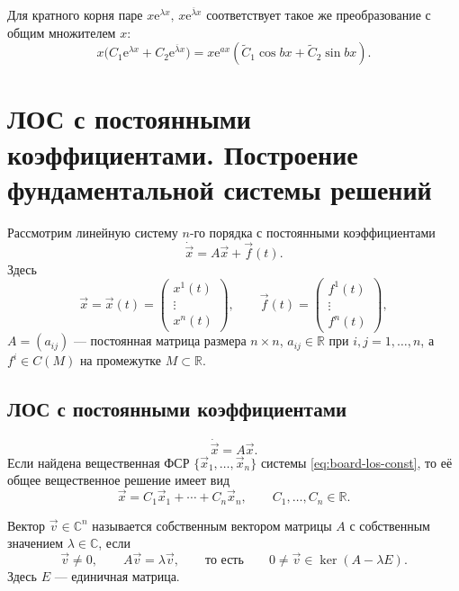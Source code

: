 \documentclass[12pt,a4paper]{article}
\numberwithin{equation}{section}
\newcommand{\R}{\mathbb{R}}
\newcommand{\vect}[1]{\vec{#1}}
\newcommand{\e}{\mathrm{e}}
\DeclareRobustCommand{\examtag}[1]{\space{\normalfont\small\color{HSEgray}(#1)}}
\begin{document}
Для кратного корня паре \(x\e^{\lambda x},\,x\e^{\overline\lambda x}\)
соответствует такое же преобразование с общим множителем \(x\):
\[
 x\bigl(C_1\e^{\lambda x}+C_2\e^{\overline\lambda x}\bigr)
 =x\e^{ax}(\widetilde C_1\cos bx+\widetilde C_2\sin bx).
\]

\section[ЛОС с постоянными коэффициентами\examtag{вопрос~23}]{ЛОС с постоянными коэффициентами. Построение фундаментальной системы решений\examtag{вопрос~23}}
\label{sec:los-constant-full}

Рассмотрим линейную систему $n$-го порядка с постоянными коэффициентами
\begin{equation}
 \dot{\vect{x}}=A\vect{x}+\vect{f}(t).
 \label{eq:board-lns-const}
\end{equation}
Здесь
\[
 \vect{x}=\vect{x}(t)=\begin{pmatrix}x^1(t)\\ \vdots\\ x^n(t)\end{pmatrix},
 \qquad
 \vect{f}(t)=\begin{pmatrix}f^1(t)\\ \vdots\\ f^n(t)\end{pmatrix},
\]
$A=(a_{ij})$ --- постоянная матрица размера $n\times n$,
$a_{ij}\in\R$ при $i,j=1,\ldots,n$,
а $f^i\in C(M)$ на промежутке $M\subset\R$.

\subsection{ЛОС с постоянными коэффициентами}

\begin{equation}
 \dot{\vect{x}}=A\vect{x}.
 \label{eq:board-los-const}
\end{equation}
Если найдена вещественная ФСР $\{\vect{x}_1,\ldots,\vect{x}_n\}$
системы \eqref{eq:board-los-const}, то её общее вещественное решение имеет вид
\[
 \vect{x}=C_1\vect{x}_1+\cdots+C_n\vect{x}_n,\qquad
 C_1,\ldots,C_n\in\R.
\]

\begin{definitionHSE}
Вектор $\vect v\in\mathbb C^n$ называется собственным вектором матрицы $A$
с собственным значением $\lambda\in\mathbb C$, если
\[
 \vect v\ne0,\qquad A\vect v=\lambda\vect v,
 \qquad\text{то есть}\qquad
 0\ne\vect v\in\ker(A-\lambda E).
\]
Здесь $E$ --- единичная матрица.
\end{definitionHSE}
\end{document}
